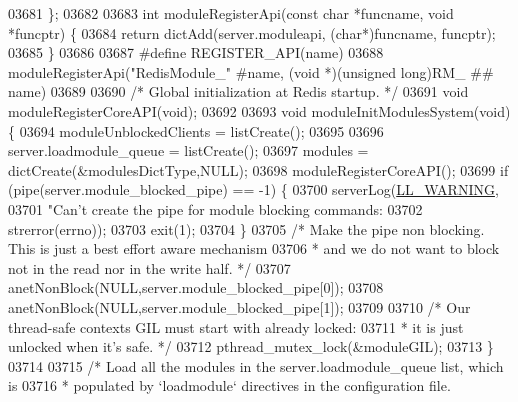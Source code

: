 \begin{DoxyCode}
{{{{{{{{{{03681 \};
03682 
03683 \textcolor{keywordtype}{int} moduleRegisterApi(\textcolor{keyword}{const} \textcolor{keywordtype}{char} *funcname, \textcolor{keywordtype}{void} *funcptr) \{
03684     \textcolor{keywordflow}{return} dictAdd(server.moduleapi, (\textcolor{keywordtype}{char}*)funcname, funcptr);
03685 \}
03686 
03687 \textcolor{preprocessor}{#}\textcolor{preprocessor}{define} \textcolor{preprocessor}{REGISTER\_API}\textcolor{preprocessor}{(}\textcolor{preprocessor}{name}\textcolor{preprocessor}{)}
03688     \textcolor{preprocessor}{moduleRegisterApi}\textcolor{preprocessor}{(}\textcolor{stringliteral}{"RedisModule\_"} \textcolor{preprocessor}{#}\textcolor{preprocessor}{name}\textcolor{preprocessor}{,} \textcolor{preprocessor}{(}\textcolor{keywordtype}{void} \textcolor{preprocessor}{*}\textcolor{preprocessor}{)}\textcolor{preprocessor}{(}\textcolor{keywordtype}{unsigned} \textcolor{keywordtype}{long}\textcolor{preprocessor}{)}\textcolor{preprocessor}{RM\_} \textcolor{preprocessor}{##} \textcolor{preprocessor}{name}\textcolor{preprocessor}{)}
03689 
03690 \textcolor{comment}{/* Global initialization at Redis startup. */}
03691 \textcolor{keywordtype}{void} moduleRegisterCoreAPI(\textcolor{keywordtype}{void});
03692 
03693 \textcolor{keywordtype}{void} moduleInitModulesSystem(\textcolor{keywordtype}{void}) \{
03694     moduleUnblockedClients = listCreate();
03695 
03696     server.loadmodule\_queue = listCreate();
03697     modules = dictCreate(&modulesDictType,NULL);
03698     moduleRegisterCoreAPI();
03699     \textcolor{keywordflow}{if} (pipe(server.module\_blocked\_pipe) == -1) \{
03700         serverLog(\hyperlink{server_8h_a31229b9334bba7d6be2a72970967a14b}{LL\_WARNING},
03701             \textcolor{stringliteral}{"Can't create the pipe for module blocking commands: %
03702             strerror(errno));
03703         exit(1);
03704     \}
03705     \textcolor{comment}{/* Make the pipe non blocking. This is just a best effort aware mechanism}
03706 \textcolor{comment}{     * and we do not want to block not in the read nor in the write half. */}
03707     anetNonBlock(NULL,server.module\_blocked\_pipe[0]);
03708     anetNonBlock(NULL,server.module\_blocked\_pipe[1]);
03709 
03710     \textcolor{comment}{/* Our thread-safe contexts GIL must start with already locked:}
03711 \textcolor{comment}{     * it is just unlocked when it's safe. */}
03712     pthread\_mutex\_lock(&moduleGIL);
03713 \}
03714 
03715 \textcolor{comment}{/* Load all the modules in the server.loadmodule\_queue list, which is}
03716 \textcolor{comment}{ * populated by `loadmodule` directives in the configuration file.}
}}}}}}}}}}}
\end{DoxyCode}
